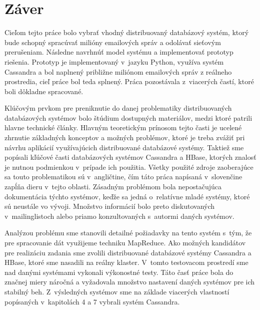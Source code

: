 \documentclass[11pt,twoside,a4paper]{book}
\begin{document}
\chapter{Záver}


Cieľom tejto práce bolo vybrať vhodný distribuovaný databázový systém, ktorý bude schopný spracúvať milióny emailových správ a odolávať sieťovým prerušeniam. Následne navrhnúť model systému a implementovať prototyp riešenia. Prototyp je implementovaný v~jazyku Python, využíva systém Cassandra a bol naplnený približne miliónom emailových správ z reálneho prostredia, cieľ práce bol teda splnený. Práca pozostávala z~viacerých častí, ktoré boli dôkladne spracované.

Klúčovým prvkom pre preniknutie do danej problematiky distribuovaných databázových systémov bolo štúdium dostupných materiálov, medzi ktoré patrili hlavne technické články. Hlavným teoretickým prínosom tejto časti je ucelené zhrnutie základných konceptov a možných problémov, ktoré je treba zvážiť pri návrhu aplikácií využívajúcich distribuované databázové systémy. Taktiež sme popísali kľúčové časti databázových systémov Cassandra a HBase, ktorých znalosť je nutnou podmienkou v~prípade ich použitia. Všetky použité zdroje zaoberajúce sa touto problematikou sú v~angličtine, čím táto práca napísaná v~slovenčine zapĺňa dieru v~tejto oblasti. Zásadným problémom bola nepostačujúca dokumentácia týchto systémov, keďže sa jedná o~relatívne mladé systémy, ktoré sú neustále vo vývoji. Množstvo informácií bolo preto diskutovaných v~mailinglistoch alebo priamo konzultovaných s~autormi daných systémov.

Analýzou problému sme stanovili detailné požiadavky na tento systém s~tým, že pre spracovanie dát využijeme techniku MapReduce. Ako možných kandidátov pre realizáciu zadania sme zvolili distribuované databázové systémy Cassandra a HBase, ktoré sme nasadili na reálny klaster. V~tomto testovacom prostredí sme nad danými systémami vykonali výkonostné testy. Táto časť práce bola do značnej miery náročná a vyžadovala množstvo nastavení daných systémov pre ich stabilný beh. Z~výsledných systémov sme na základe viacerých vlastností popísaných v~kapitolách 4 a 7 vybrali systém Cassandra.
\end{document}
